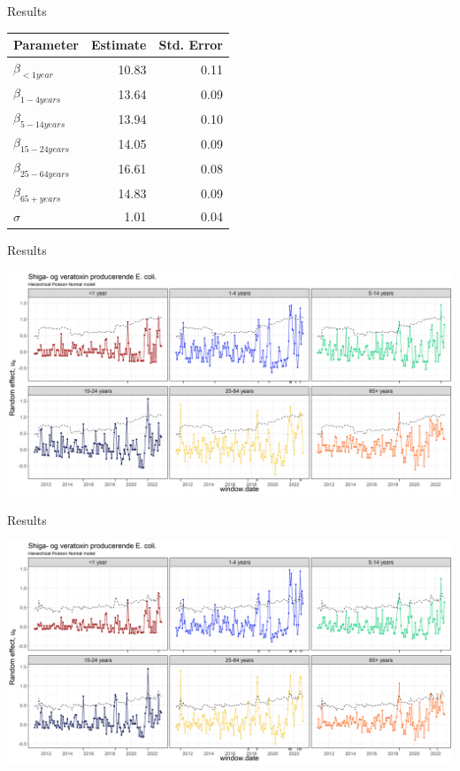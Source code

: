 \documentclass[aspectratio=169]{beamer}
\begin{document}
\begin{frame}{Results}
\tiny

\begin{table}
\centering\begingroup\fontsize{10}{12}\selectfont

\begin{tabular}{lrr}
\toprule
Parameter & Estimate & Std. Error\\
\midrule
$\beta_{<1 year}$ & 10.83 & 0.11\\
$\beta_{1-4 years}$ & 13.64 & 0.09\\
$\beta_{5-14 years}$ & 13.94 & 0.10\\
$\beta_{15-24 years}$ & 14.05 & 0.09\\
$\beta_{25-64 years}$ & 16.61 & 0.08\\
$\beta_{65+ years}$ & 14.83 & 0.09\\
$\sigma$ & 1.01 & 0.04\\
\bottomrule
\end{tabular}
\endgroup{}
\end{table}

\normalsize
\end{frame}

\begin{frame}{Results}
\protect\hypertarget{results-1}{}
\tiny

\includegraphics[width=1\linewidth]{../figures/windowedSTEDPoisN}

\normalsize
\end{frame}

\begin{frame}{Results}
\protect\hypertarget{results-2}{}
\tiny

\includegraphics[width=1\linewidth]{../figures/windowedSTEDPoisNExclude}

\normalsize
\end{frame}
\end{document}
